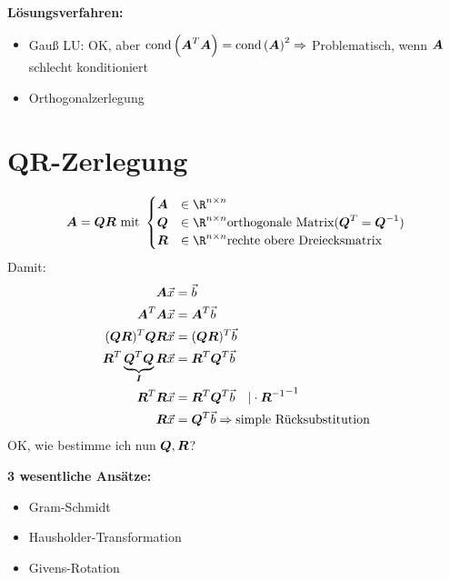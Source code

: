 \textbf{Lösungsverfahren:}
\begin{itemize}
\item Gauß LU: OK, aber $\text{cond}\left(\boldsymbol {A}^T\boldsymbol {A}\right) = \text{cond}\left(\boldsymbol {A}\right)^2\Rightarrow$ Problematisch, wenn $\boldsymbol {A}$ schlecht konditioniert
\item Orthogonalzerlegung
\end{itemize}

\section{QR-Zerlegung}
\[\ma A = \ma Q\ma R \text{ mit }\begin{cases}
\ma A & \in \R^{n\times n}\\
\ma Q & \in \R^{n\times n} \text{orthogonale Matrix} (\ma Q^T = \ma Q^{-1})\\
\ma R & \in \R^{n\times n} \text{rechte obere Dreiecksmatrix}
\end{cases}\]
Damit:
\begin{equation}
\begin{split}
\boldsymbol {A}\vec x &= \vec b\\
\boldsymbol {A}^T\boldsymbol {A}\vec x &= \boldsymbol {A}^T\vec b\\
(\boldsymbol {Q}\boldsymbol {R})^T\boldsymbol {Q}\boldsymbol {R}\vec x &= (\boldsymbol {Q}\boldsymbol {R})^T\vec b\\
\boldsymbol {R}^T\underbrace{\boldsymbol {Q}^T\boldsymbol {Q}}_{\boldsymbol {I}}\boldsymbol {R}\vec x &= \boldsymbol {R}^T\boldsymbol {Q}^T\vec b\\
\boldsymbol {R}^T\boldsymbol {R}\vec x &= \boldsymbol {R}^T\boldsymbol {Q}^T\vec b\quad\vert\cdot{\ensuremath{\boldsymbol {R}}^{-1}}^{-1}\\
\boldsymbol {R}\vec x &= \boldsymbol {Q}^T\vec b\Rightarrow \text{simple Rücksubstitution}
\end{split}
\end{equation}
OK, wie bestimme ich nun $\boldsymbol {Q},\boldsymbol {R}$?

\textbf{3 wesentliche Ansätze:}
\begin{itemize}
\item Gram-Schmidt
\item Hausholder-Transformation
\item Givens-Rotation
\end{itemize}

